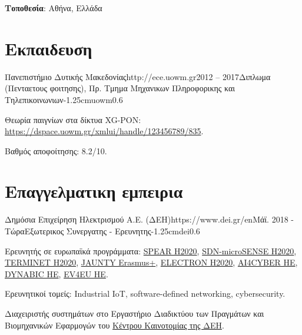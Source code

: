 \documentclass{mycv}
\begin{document}
	\thispagestyle{plain}
	\begin{center}
		\centering
		{\bf Τοποθεσία}: Αθήνα, Ελλάδα
	\end{center}
	\section{Εκπαιδευση}
	
	\begin{EntryDatedLogo}{Πανεπιστήμιο Δυτικής Μακεδονίας}{http://ece.uowm.gr}{2012 -- 2017}{Διπλωμα (Πενταετους φοιτησης), Πρ. Τμημα Μηχανικων Πληροφορικης και Τηλεπικοινωνιων}{-1.25cm}{uowm}{0.6}
		\begin{Itemize}
			\item Θεωρία παιγνίων στα δίκτυα XG-PON: \url{https://dspace.uowm.gr/xmlui/handle/123456789/835}.
			\item Βαθμός αποφοίτησης: 8.2/10.
		\end{Itemize}
	\end{EntryDatedLogo}
	
	\section{Επαγγελματικη εμπειρια}
	\begin{EntryDatedLogo}{Δημόσια Επιχείρηση Ηλεκτρισμού Α.Ε. (ΔΕΗ)}{https://www.dei.gr/en}{Μάϊ. 2018 - Τώρα}{Εξωτερικος Συνεργατης - Ερευνητης}{-1.25cm}{dei}{0.6}
	\begin{Itemize}
		\item Ερευνητής σε ευρωπαϊκά προγράμματα: \href{https://cordis.europa.eu/project/id/787011}{SPEAR H2020}, \href{https://cordis.europa.eu/project/id/833955}{SDN-microSENSE H2020}, \href{https://cordis.europa.eu/project/id/957406}{TERMINET H2020}, \href{https://www.jaunty.eu/}{JAUNTY Erasmus+}, \href{https://cordis.europa.eu/project/id/101021936}{ELECTRON H2020}, \href{https://cordis.europa.eu/project/id/101070450}{AI4CYBER HE}, \href{https://cordis.europa.eu/project/id/101070455}{DYNABIC HE}, \href{https://cordis.europa.eu/project/id/101056765}{EV4EU HE}.
		\item Ερευνητικοί τομείς: Industrial IoT, software-defined networking, cybersecurity.
		\item Διαχειριστής συστημάτων στο Εργαστήριο Διαδικτύου των Πραγμάτων και Βιομηχανικών Εφαρμογών του \href{https://innovationhub.dei.gr/el/}{Κέντρου Καινοτομίας της ΔΕΗ}.

	\end{Itemize}
	\end{EntryDatedLogo}
\end{document}
